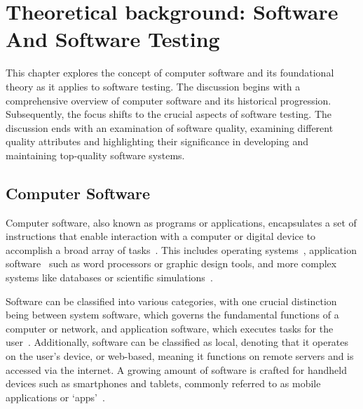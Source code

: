 \vspace{21.5pt}
\chapter{Theoretical background: Software And Software Testing}
This chapter explores the concept of computer software and its foundational
theory as it applies to software testing. The discussion begins with a
comprehensive overview of computer software and its historical progression.
Subsequently, the focus shifts to the crucial aspects of software testing.
The discussion ends with an examination of software quality, examining different
quality attributes and highlighting their significance in developing and
maintaining top-quality software systems.

\section{Computer Software}
Computer software, also known as programs or applications, encapsulates a set of instructions that
enable interaction with a computer or digital device to accomplish a broad array of
tasks~\cite{Software76:online}. This includes operating systems~\cite{stallings1998operating},
application software~\cite{Definiti63:online} such as
word processors or graphic design tools, and more complex systems like databases or
scientific simulations~\cite{Definiti63:online}.

Software can be classified into various categories, with one crucial distinction
being between system software, which governs the fundamental functions of a
computer or network, and application software, which executes tasks for the
user~\cite{WhatisSy89:online}\cite{Definiti63:online}.
Additionally, software can be classified as local, denoting that it operates on
the user's device, or web-based, meaning it functions on remote servers and is
accessed via the internet. A growing amount of software is crafted for handheld
devices such as smartphones and tablets, commonly referred to as mobile
applications or `apps'~\cite{yetisen2014regulation}.

